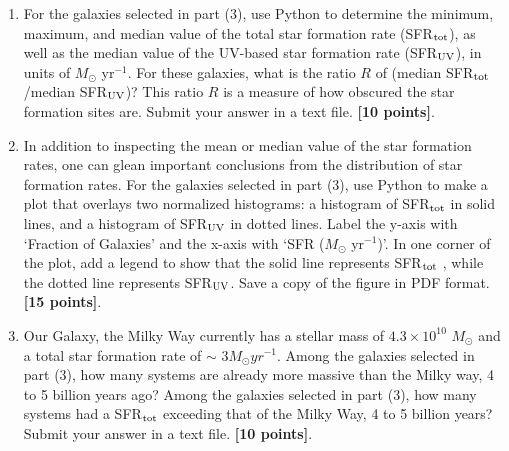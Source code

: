 \documentclass[11pt]{article}    %
\begin{document}
\begin{enumerate}
\noindent 
For galaxies with a successful {\it Spitzer} 24 micron detection, 
a photometric redshift $z$ in the range  $0.47 < z \le 0.62$, and 
stellar masses  $M \ge$~$5 \times  10^{9}$ $M_{\odot}$, write 
a Python program, which  makes a plot of  $\log$(SFR$_{\rm tot}$) 
versus $\log(M$).
Plot galaxies with $SFR_{\rm tot} \ge 3.0 \  M_{\odot}$ yr$^{-1}$ (i.e., 
with star formation rates higher than that of our Milky Way) as red stars, 
and the remaining galaxies as black stars. 
Label the x-axis with  `$\log(M/M_{\odot}$)', and the y-axis with
`$\log$(SFR$_{\rm tot}$/$M_{\odot}$  yr$^{-1}$)'.
Add a legend label for both data sets. Label the red stars as: `SFR$_{\rm tot} \geq 3.0 M_{\odot}$ yr$^{-1}$'
and label the black stars as `SFR$_{\rm tot} < 3.0 M_{\odot}$ yr$^{-1}$.
Save a copy of the figure in PDF format and turn it in.
{\bf [10 points]}.


\vspace{1mm}
\item
\noindent
For the galaxies selected in part (3), use Python to determine the
minimum, maximum, and median value of the total star formation 
rate (SFR$_{\rm tot}$), as well as the median value of the
UV-based star formation rate (SFR$_{\rm UV}$), 
in units of $M_{\odot}$ yr$^{-1}$. 
For these galaxies, what is the ratio $R$ of 
(median SFR$_{\rm tot}$/median  SFR$_{\rm UV}$)?
This ratio $R$ is a measure of how obscured the star formation sites
are.
Submit your answer in a text file. 
{\bf [10 points]}.



\vspace{1mm}
\item
\noindent
In addition to inspecting the mean or median value of the 
star formation rates, one can glean important conclusions from 
the distribution of star formation rates. 
For the galaxies selected in part (3), use Python to  make a plot that 
overlays two normalized histograms: a histogram of 
SFR$_{\rm tot}$ in  solid lines,  and  a histogram of SFR$_{\rm UV}$ 
in dotted lines.  
Label the y-axis with `Fraction of Galaxies' and the x-axis with 
`SFR ($M_{\odot}$  yr$^{-1}$)'.  
In one corner of the plot, add a legend to show that the solid
line represents SFR$_{\rm tot}$ , while the dotted line represents  
SFR$_{\rm UV}$. 
Save a copy of the figure in PDF format.
{\bf [15 points]}.


\vspace{1mm}
\item
\noindent
Our Galaxy, the Milky Way currently has a stellar mass of 
$4.3 \times  10^{10}$ $M_{\odot}$ and a total star formation rate 
of $\sim$ $3 M_{\odot} yr^{-1}$. 
Among the galaxies selected in part (3), 
how many systems are already more massive than the Milky way, 
4 to 5 billion years ago? 
Among the galaxies selected in part (3), 
how many systems had a SFR$_{\rm tot}$ exceeding that of 
the Milky Way, 4 to 5 billion years? 
Submit your answer in a text file. 
{\bf [10 points]}.


\end{enumerate}
\end{document}
